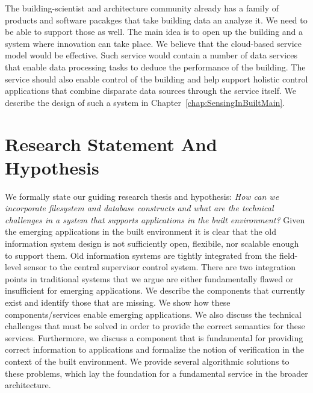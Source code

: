 The building-scientist and architecture community already has a family of products and software pacakges that take building data an analyze
it.  We need to be able to support those as well.  The main idea is to open up the building and a system where innovation can take place.
We believe that the cloud-based service model would be effective.  Such service would contain a number of data services 
that enable data processing tasks to deduce the performance of the building.  The service should also enable control of the building
and help support holistic control applications that combine disparate data sources through the service itself.
We describe the design of such a system in Chapter~\ref{chap:SensingInBuiltMain}.


\section{Research Statement And Hypothesis}
We formally state our guiding research thesis and hypothesis:
\emph{How can we incorporate filesystem and database constructs and what are the technical challenges in a system that supports applications
in the built environment?}
Given the emerging applications in
the built environment it is clear that the old information system design is not sufficiently open, flexibile, nor
scalable enough to support them.  Old information systems are tightly integrated from the field-level sensor to
the central supervisor control system.  There are two integration points in traditional systems that we argue 
are either fundamentally flawed or insufficient for emerging applications.  We describe the components that 
currently exist and identify those that are missing.  We show how these components/services enable emerging applications.  We also
discuss the technical challenges that must be solved in order to provide the correct semantics for these services.
Furthermore, we discuss a component that is fundamental for providing correct information to applications 
and formalize the notion of verification in the context of the built environment.  We provide several algorithmic 
solutions to these problems, which lay the foundation for a fundamental service in the broader architecture.

